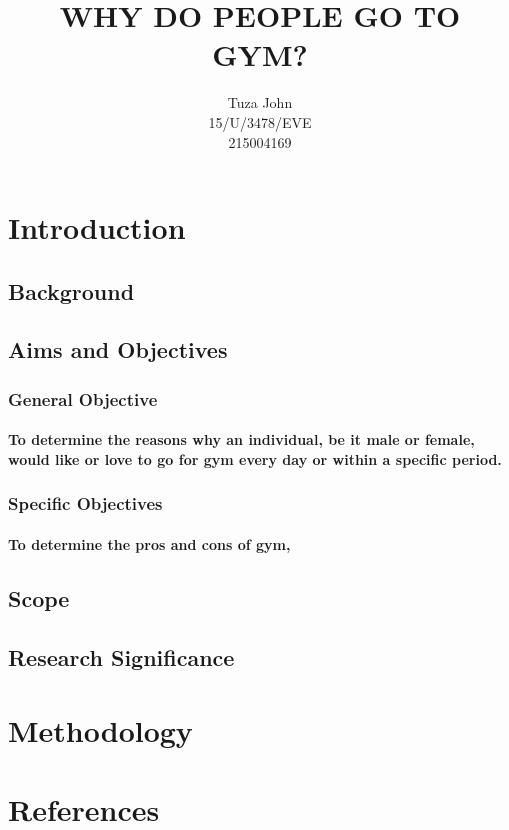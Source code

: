 \documentclass[12pt]{report}
\title{\textbf{WHY DO PEOPLE GO TO GYM?}}
\author{Tuza John \\15/U/3478/EVE\\215004169}
\begin{document}
	\maketitle
	
	\section{Introduction}
	
	\subsection{Background}
	
	\subsection{Aims and Objectives}
	
	\subsubsection{General Objective}
	
	\paragraph{To determine the reasons why an individual, be it male or female, would like or love to go for gym every day or within a specific period.}
	
	\subsubsection{Specific Objectives}
	
	\paragraph{To determine the pros and cons of gym,}
	
	\subsection{Scope}
	
	\subsection{Research Significance}
	
	\section{Methodology}
	
	\section{References}
\end{document}
